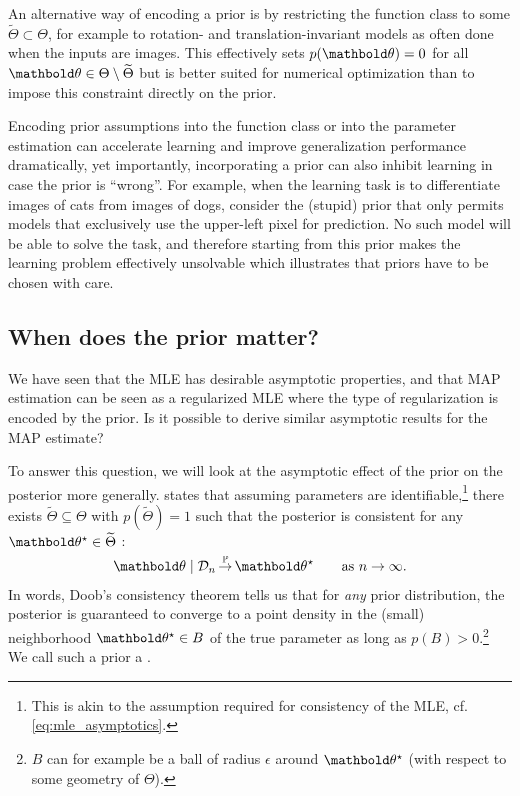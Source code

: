 An alternative way of encoding a prior is by restricting the function class to some $\widetilde{\Theta} \subset \Theta$, for example to rotation- and translation-invariant models as often done when the inputs are images.
This effectively sets $p(\vtheta) = 0$ for all $\vtheta \in \Theta \setminus \widetilde{\Theta}$ but is better suited for numerical optimization than to impose this constraint directly on the prior.

Encoding prior assumptions into the function class or into the parameter estimation can accelerate learning and improve generalization performance dramatically, yet importantly, incorporating a prior can also inhibit learning in case the prior is ``wrong''.
For example, when the learning task is to differentiate images of cats from images of dogs, consider the (stupid) prior that only permits models that exclusively use the upper-left pixel for prediction.
No such model will be able to solve the task, and therefore starting from this prior makes the learning problem effectively unsolvable which illustrates that priors have to be chosen with care.

\subsection{When does the prior matter?}

We have seen that the MLE has desirable asymptotic properties, and that MAP estimation can be seen as a regularized MLE where the type of regularization is encoded by the prior.
Is it possible to derive similar asymptotic results for the MAP estimate?

To answer this question, we will look at the asymptotic effect of the prior on the posterior more generally.
 states that assuming parameters are identifiable,\footnote{This is akin to the assumption required for consistency of the MLE, cf. \cref{eq:mle_asymptotics}.} there exists $\widetilde{\Theta} \subseteq \Theta$ with $p(\widetilde{\Theta}) = 1$ such that the posterior is consistent for any $\opt{\vtheta} \in \widetilde{\Theta}$ \citep{doob1949application,miller2016lecture,miller2018detailed}: \begin{align}
  \vtheta \mid \spD_n \convp \opt{\vtheta} \qquad\text{as $n \to \infty$}.
\end{align}
In words, Doob's consistency theorem tells us that for \emph{any} prior distribution, the posterior is guaranteed to converge to a point density in the (small) neighborhood $\opt{\vtheta} \in B$ of the true parameter as long as $p(B) > 0$.\footnote{$B$ can for example be a ball of radius $\epsilon$ around $\opt{\vtheta}$ (with respect to some geometry of $\Theta$).}
We call such a prior a .

